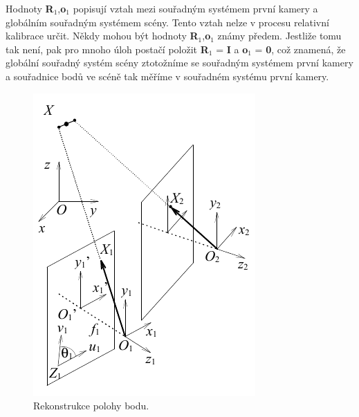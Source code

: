 Hodnoty \textbf{R}$_1$,\textbf{o}$_1$ popisují vztah mezi souřadným systémem první kamery a globálním souřadným systémem scény. Tento vztah nelze v procesu relativní kalibrace určit. Někdy mohou být hodnoty \textbf{R}$_1$,\textbf{o}$_1$ známy předem. Jestliže tomu tak není, pak pro mnoho úloh postačí položit \textbf{R}$_1$ = \textbf{I} a \textbf{o}$_1$ = \textbf{0}, což znamená, že globální souřadný systém scény ztotožníme se souřadným systémem první kamery a souřadnice bodů ve scéně tak měříme v souřadném systému první kamery.

\begin{figure}[th]
    \begin{center}
        \includegraphics[scale=.9]{11_stereo/images/img_11_4.pdf}
    \end{center}
    \caption{Rekonstrukce polohy bodu.}
    \label{img:11_4}
\end{figure}

